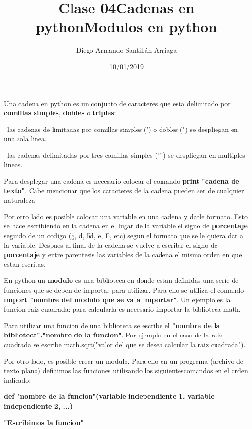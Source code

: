 \documentclass[letter paper, 12pt, oneside]{article}
\title{\Huge Clase 04}
\author{Diego Armando Santillán Arriaga}
\date{10/01/2019}
\begin{document}
	\maketitle
\newpage
\title{\huge\textbf{Cadenas  en python}}


Una cadena en python es un conjunto de caracteres que esta delimitado por \textbf{comillas simples}, \textbf{dobles} o \textbf{triples}:


~las cadenas de limitadas por comillas simples (') o dobles (") se despliegan en una sola linea. 


~las cadenas delimitadas por tres comillas simples (''') se despliegan en multiples lineas. 


Para desplegar una cadena es necesario colocar el comando \textbf{print "cadena de texto"}. Cabe mencionar que los caracteres de la cadena pueden ser de cualquier naturaleza. 


Por otro lado es posible colocar una variable en una cadena y darle formato. Esto se hace escribiendo en la cadena en el lugar de la variable el signo de \textbf{porcentaje} seguido de un codigo (g, d, 5d, e, E, etc) segun el formato que se le quiera dar a la variable. Despues al final de la cadena se vuelve a escribir el signo de \textbf{porcentaje} y entre parentesis las variables de la cadena el mismo orden en que estan escritas. 



\title{\huge\textbf{Modulos en python}}
	

En python un \textbf{modulo} es una biblioteca en donde estan definidas una serie de funciones que se deben de importar para utilizar. Para ello se utiliza el comando \textbf{import "nombre del modulo que se va a importar"}. Un ejemplo es la funcion raiz cuadrada: para calcularla es necesario importar la biblioteca math. 

Para utilizar una funcion de una biblioteca se escribe el \textbf{"nombre de la biblioteca"."nombre de la funcion"}. Por ejemplo en el caso de la raiz cuadrada se escribe math.sqrt("valor del que se desea calcular la raiz cuadrada").


Por otro lado, es posible crear un modulo. Para ello en un programa (archivo de texto plano) definimos las funciones utilizando los siguientescomandos en el orden indicado:


\textbf{def "nombre de la funcion"(variable independiente 1, variable independiente 2, ...)}

\textbf{"Escribimos la funcion"}
\end{document}
